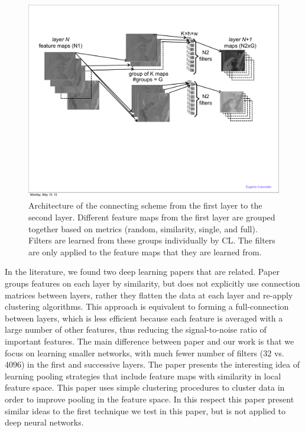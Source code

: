 \documentclass{article} %
\begin{document}
\begin{figure}
\includegraphics[width=5in]{fig-learnlayers.pdf}
\caption{Architecture of the connecting scheme from the first layer to the second layer. Different feature maps from the first layer are grouped together based on metrics (random, similarity, single, and full). Filters are learned from these groups individually by CL. The filters are only applied to the feature maps that they are learned from.}
\label{fig-learnlayers}
\end{figure}

In the literature, we found two deep learning papers that are related. 
Paper \cite{coates2012learning} groups features on each layer by similarity, but does not explicitly use connection matrices between layers, rather they flatten the data at each layer and re-apply clustering algorithms. This approach is equivalent to forming a full-connection between layers, which is less efficient because each feature is averaged with a large number of other features, thus reducing the signal-to-noise ratio of important features. The main difference between paper \cite{coates2012learning} and our work is that we focus on learning smaller networks, with much fewer number of filters (32 vs. 4096) in the first and successive layers. 
The paper \cite{boureau_2011} presents the interesting idea of learning pooling strategies that include feature maps with similarity in local feature space. This paper uses simple clustering procedures to cluster data in order to improve pooling in the feature space. In this respect this paper present similar ideas to the first technique we test in this paper, but is not applied to deep neural networks.
\end{document}
